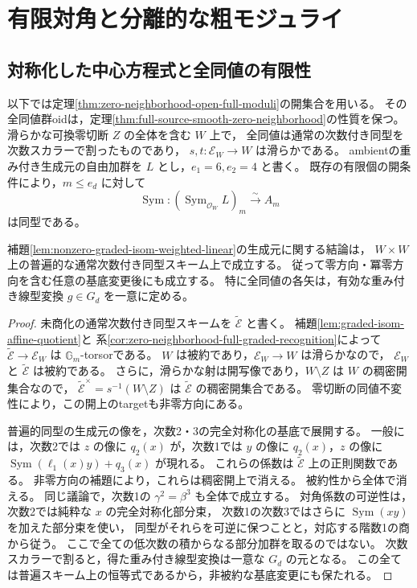 \section{有限対角と分離的な粗モジュライ}
\label{sec:separated-coarse-moduli}

\subsection{対称化した中心方程式と全同値の有限性}

以下では定理\ref{thm:zero-neighborhood-open-full-moduli}の開集合を用いる。
その全同値群oidは，定理\ref{thm:full-source-smooth-zero-neighborhood}の性質を保つ。
滑らかな可換零切断 $Z$ の全体を含む $W$ 上で，
全同値は通常の次数付き同型を次数スカラーで割ったものであり，
$s,t:\mathcal E_W\to W$ は滑らかである。
ambientの重み付き生成元の自由加群を $L$ とし，$e_1=6,e_2=4$ と書く。
既存の有限個の開条件により，$m\le e_d$ に対して
\[
 \operatorname{Sym}:(\operatorname{Sym}_{\mathcal O_W}L)_m
                  \xrightarrow{\sim} A_m
\]
は同型である。

\begin{lemma}[零方向も含む全同値の重み付き線型化]
\label{lem:all-graded-isom-weighted-linear}
補題\ref{lem:nonzero-graded-isom-weighted-linear}の生成元に関する結論は，
$W\times W$ 上の普遍的な通常次数付き同型スキーム上で成立する。
従って零方向・冪零方向を含む任意の基底変更後にも成立する。
特に全同値の各矢は，有効な重み付き線型変換 $g\in G_d$ を一意に定める。
\end{lemma}
\begin{proof}
未商化の通常次数付き同型スキームを $\widetilde{\mathcal E}$ と書く。
補題\ref{lem:graded-isom-affine-quotient}と
系\ref{cor:zero-neighborhood-full-graded-recognition}によって
$\widetilde{\mathcal E}\to\mathcal E_W$ は $\mathbb G_m$-torsorである。
$W$ は被約であり，$\mathcal E_W\to W$ は滑らかなので，
$\mathcal E_W$ と $\widetilde{\mathcal E}$ は被約である。
さらに，滑らかな射は開写像であり，$W\setminus Z$ は $W$ の稠密開集合なので，
$\widetilde{\mathcal E}^{\times}=s^{-1}(W\setminus Z)$ は
$\widetilde{\mathcal E}$ の稠密開集合である。
零切断の同値不変性により，この開上のtargetも非零方向にある。

普遍的同型の生成元の像を，次数2・3の完全対称化の基底で展開する。
一般には，次数2では $z$ の像に $q_2(x)$ が，次数1では
$y$ の像に $q_2(x)$，$z$ の像に
$\operatorname{Sym}(\ell_1(x)y)+q_3(x)$ が現れる。
これらの係数は $\widetilde{\mathcal E}$ 上の正則関数である。
非零方向の補題により，これらは稠密開上で消える。
被約性から全体で消える。
同じ議論で，次数1の $\gamma^2=\beta^3$ も全体で成立する。
対角係数の可逆性は，次数2では純粋な $x$ の完全対称化部分束，
次数1の次数3ではさらに $\operatorname{Sym}(xy)$ を加えた部分束を使い，
同型がそれらを可逆に保つことと，対応する階数1の商から従う。
ここで全ての低次数の積からなる部分加群を取るのではない。
次数スカラーで割ると，得た重み付き線型変換は一意な $G_d$ の元となる。
この全ては普遍スキーム上の恒等式であるから，非被約な基底変更にも保たれる。
\end{proof}


